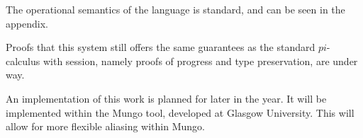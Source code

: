 The operational semantics of the language is standard, and can be seen in the appendix.

Proofs that this system still offers the same guarantees as the standard $pi$-calculus with session, namely proofs of progress and type preservation, are under way.

An implementation of this work is planned for later in the year. It will be implemented within the Mungo tool\cite{kouzapas16}, developed at Glasgow University. This will allow for more flexible aliasing within Mungo.


